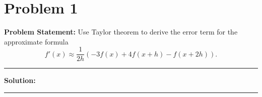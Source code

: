 \clearpage
\section*{Problem 1}

\textbf{Problem Statement:} Use Taylor theorem to derive the error term for the approximate formula
$$f'(x) \approx \frac{1}{2h} (-3f(x) + 4f(x+h) - f(x+2h)).$$

\noindent\rule{\textwidth}{0.4pt}

\vspace{1em}

\textbf{Solution:}


\vspace{2em}
\noindent\rule{\textwidth}{0.4pt}
